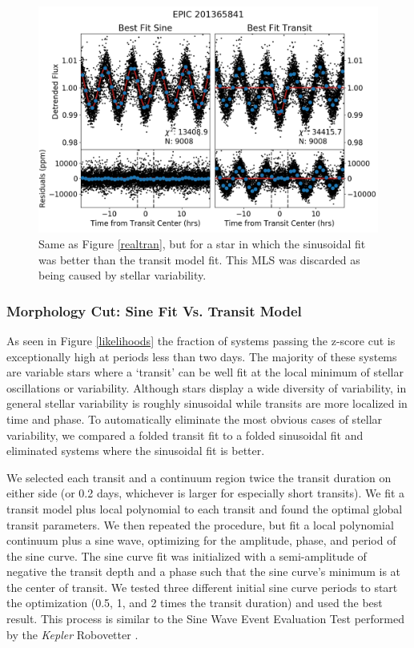 \documentclass[twocolumn]{aastex62}
\newcommand{\project}[1]{\textsl{#1}}
\begin{document}
\begin{figure}[tbp]
\includegraphics[width=\textwidth]{sinfit_var.png}
\caption{Same as Figure \ref{realtran}, but for a star in which the
  sinusoidal fit was better than the transit model fit. This MLS was
  discarded as being caused by stellar variability. \label{vartran}}
\end{figure}


\subsubsection{Morphology Cut: Sine Fit Vs. Transit Model}
\label{sinecut}

As seen in Figure \ref{likelihoods} the fraction of systems passing
the z-score cut is exceptionally high at periods less than two days.
The majority of these systems are variable stars where a `transit' can
be well fit at the local minimum of stellar oscillations or
variability. Although stars display a wide diversity of variability,
in general stellar variability is roughly sinusoidal while transits
are more localized in time and phase. To automatically eliminate the
most obvious cases of stellar variability, we compared a folded
transit fit to a folded sinusoidal fit and eliminated systems where
the sinusoidal fit is better.

We selected each transit and a continuum region twice the transit
duration on either side (or 0.2 days, whichever is larger for
especially short transits). We fit a transit model plus local
polynomial to each transit and found the optimal global transit
parameters. We then repeated the procedure, but fit a local polynomial
continuum plus a sine wave, optimizing for the amplitude, phase, and
period of the sine curve.  The sine curve fit was initialized with a
semi-amplitude of negative the transit depth and a phase such that the
sine curve's minimum is at the center of transit. We tested three
different initial sine curve periods to start the optimization (0.5,
1, and 2 times the transit duration) and used the best result. This
process is similar to the Sine Wave Event Evaluation Test performed by
the \project{Kepler} Robovetter \citep{tho18}.
\end{document}
